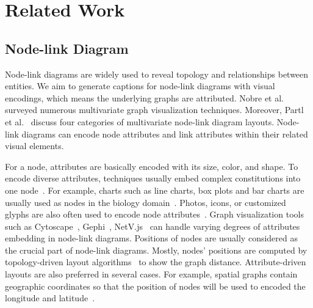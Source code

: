 \section{Related Work}\label{sec:relatedwork}
\subsection{Node-link Diagram}
Node-link diagrams are widely used to reveal topology and relationships between entities.
We aim to generate captions for node-link diagrams with visual encodings, which means the underlying graphs are attributed.
Nobre et al.~\cite{DBLP:journals/cgf/NobreMSL19} surveyed numerous multivariate graph visualization techniques.
Moreover, Partl et al.~\cite{DBLP:conf/biovis/PartlKLKSS12} discuss four categories of multivariate node-link diagram layouts.
Node-link diagrams can encode node attributes and link attributes within their related visual elements.

For a node, attributes are basically encoded with its size, color, and shape.
To encode diverse attributes, techniques usually embed complex constitutions into one node~\cite{DBLP:conf/infovis/AuberCJM03}.
For example, charts such as line charts, box plots and bar charts are usually used as nodes in the biology domain~\cite{gehlenborg2010visualization, DBLP:conf/iv/JusufiDK10}.
Photos, icons, or customized glyphs are also often used to encode node attributes~\cite{DBLP:conf/chi/DunneS13}.
Graph visualization tools such as Cytoscape~\cite{DBLP:journals/bioinformatics/FranzLHDSB16}, Gephi~\cite{DBLP:conf/icwsm/BastianHJ09}, NetV.js~\cite{HAN2021} can handle varying degrees of attributes embedding in node-link diagrams.
Positions of nodes are usually considered as the crucial part of node-link diagrams.
Mostly, nodes' positions are computed by topology-driven layout algorithms~\cite{DBLP:journals/spe/FruchtermanR91, DBLP:journals/cgf/KruigerRMKKT17, DBLP:journals/tvcg/GansnerHN13, DBLP:journals/tvcg/ZhuCHHLZ21} to show the graph distance.
Attribute-driven layouts are also preferred in several cases.
For example, spatial graphs contain geographic coordinates so that the position of nodes will be used to encoded the longitude and latitude~\cite{DBLP:journals/tvcg/ElzenW14, DBLP:journals/tvcg/Guo09}.

